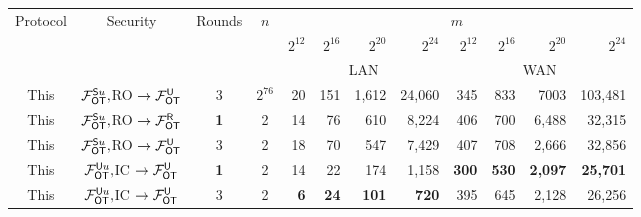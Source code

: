 \begin{figure*}[t!]\centering
	\begin{tabular}{|c||c|c|c || r | r|  r |r |r|r |r|r|}
		\hline
		\multirow{3}{*}{Protocol} &         \multirow{3}{*}{Security}          & \multirow{3}{*}{Rounds} & \multirow{3}{*}{$n$} &                                     \multicolumn{8}{c|}{$m$}                                     \\ 
		                          &                                            &                         &                      & $2^{12}$ & $2^{16}$ & $2^{20}$ & $2^{24}$  & $2^{12}$  &  $2^{16}$ & $2^{20}$    &      $2^{24}$ \\ \cline{5-12}
		                          &                                            &                         &                      &         \multicolumn{4}{c|}{LAN}          &              \multicolumn{4}{c|}{WAN}               \\ \hline\hline
		          This            &  $\mathcal{F}_{\mathsf{OT}}^{\mathsf{S} u},$RO $\rightarrow\mathcal{F}_{\mathsf{OT}}^\mathsf{U}$  &            3            &       $2^{76}$       & 20       & 151      & 1,612    & 24,060    & 345       &       833 & 7003        &       103,481 \\ \hline
		          This            & $\mathcal{F}_{\mathsf{OT}}^{\mathsf{S} u},$RO $\rightarrow\mathcal{F}_{\mathsf{OT}}^\mathsf{R}$ &         {\bf 1}         &          2           & 14       & 76       & 610      & 8,224     & 406       &       700 & 6,488       &        32,315 \\ \hline
		          This            &  $\mathcal{F}_{\mathsf{OT}}^{\mathsf{S} u},$RO $\rightarrow\mathcal{F}_{\mathsf{OT}}^\mathsf{U}$  &            3            &          2           & 18       & 70       & 547      & 7,429     & 407       &       708 & 2,666       &        32,856 \\ \hline
		          This            &   $\mathcal{F}_{\mathsf{OT}}^{\mathsf{U} u},$IC $\rightarrow\mathcal{F}_{\mathsf{OT}}^\mathsf{U}$    &         {\bf 1}         &          2           & 14       & 22       & 174      & 1,158     & {\bf 300} & {\bf 530} & {\bf 2,097} & {\bf  25,701} \\ \hline
		          This            &   $\mathcal{F}_{\mathsf{OT}}^{\mathsf{U} u},$IC $\rightarrow\mathcal{F}_{\mathsf{OT}}^\mathsf{U}$    &            3            &          2           & {\bf6}   & {\bf24}  & {\bf101} & {\bf 720} & {395}     &    { 645} & {2,128}     &      {26,256} \\ \hline
	\end{tabular}
	\caption{ \label{fig:extTimes}}	
\end{figure*}



